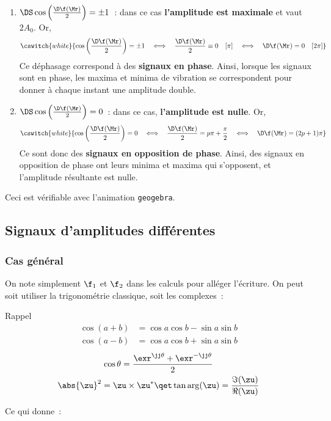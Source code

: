 \documentclass[../main/main.tex]{subfiles}
\begin{document}
\begin{enumerate}[label=$\triangleright$]
    \item $\DS \cos \left( \frac{\D\f(\Mr)}{2} \right) = \pm 1$~: dans ce cas
        \textbf{l'amplitude est maximale} et vaut $2A_0$. Or,
        \[\cswitch{white}{
            \cos \left( \frac{\D\f(\Mr)}{2} \right) = \pm 1
            \quad\Longleftrightarrow\quad
            \frac{\D\f(\Mr)}{2} \equiv 0 \quad[\pi]
            \quad\Longleftrightarrow\quad
            \D\f(\Mr) = 0 \quad[2\pi]
        }\]
        Ce déphasage correspond à des \textbf{signaux en phase}. Ainsi, lorsque
        les signaux sont en phase, les maxima et minima de vibration se
        correspondent pour donner à chaque instant une amplitude double.
    \item $\DS \cos \left( \frac{\D\f(\Mr)}{2} \right) = 0$~: dans ce cas,
        \textbf{l'amplitude est nulle}. Or,
        \[\cswitch{white}{
            \cos \left( \frac{\D\f(\Mr)}{2} \right) = 0
            \quad\Longleftrightarrow\quad
            \frac{\D\f(\Mr)}{2} = p\pi + \frac{\pi}{2}
            \quad\Longleftrightarrow\quad
            \D\f(\Mr) = (2p+1)\pi
        }\]
        Ce sont donc des \textbf{signaux en opposition de phase}. Ainsi, des
        signaux en opposition de phase ont leurs minima et maxima qui
        s'opposent, et l'amplitude résultante est nulle.
\end{enumerate}
Ceci est vérifiable avec l'animation \texttt{geogebra}.


\subsection{Signaux d'amplitudes différentes}
\subsubsection{Cas général}

\noindent
On note simplement $\f_1$ et $\f_2$ dans les calculs pour alléger l'écriture.
On peut soit utiliser la trigonométrie classique, soit les complexes~:
\begin{brappside}{Rappel}
    \vspace*{-15pt}
    \begin{align*}
        \cos(a+b) &= \cos a\cos b - \sin a\sin b\\
        \cos(a-b) &= \cos a\cos b + \sin a\sin b
    \end{align*}
    \tcblower
    \vspace*{-15pt}
    \begin{gather*}
        \cos\theta = \frac{\exr^{\jj\theta}+\exr^{-\jj\theta}}{2}\\
        \abs{\zu}^2 = \zu\times\zu^*
        \qet
        \tan\arg(\zu) = \frac{\Im(\zu)}{\Re(\zu)}
    \end{gather*}
\end{brappside}
Ce qui donne~:
\end{document}
